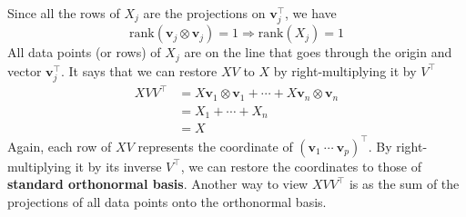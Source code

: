 \noindent Since all the rows of $X_j$ are the projections on $\mathbf{v}_{j}^{\top}$, we have
\begin{equation*}
    \text{rank}(\mathbf{v}_j \otimes \mathbf{v}_j) =1 \Longrightarrow \text{rank}(X_j) = 1
\end{equation*}
All data points (or rows) of $X_j$ are on the line that goes through the origin and vector $\mathbf{v}_j^{\top}$. It says that we can restore $XV$ to $X$ by right-multiplying it by $V^{\top}$
\begin{align*}
        XVV^{\top} &=  X \mathbf{v}_1 \otimes \mathbf{v}_1 + \cdots + X \mathbf{v}_n \otimes \mathbf{v}_n\\
        & = X_1 + \cdots + X_n\\
        & = X
\end{align*}
Again, each row of $XV$ represents the coordinate of $(\mathbf{v}_1\ \cdots \ \mathbf{v}_p)^{\top}$. By right-multiplying it by its inverse $V^\top$, we can restore the coordinates to those of \textbf{standard orthonormal basis}. Another way to view $XVV^{\top}$ is as the sum of 
the projections of all data points onto the orthonormal basis. 

